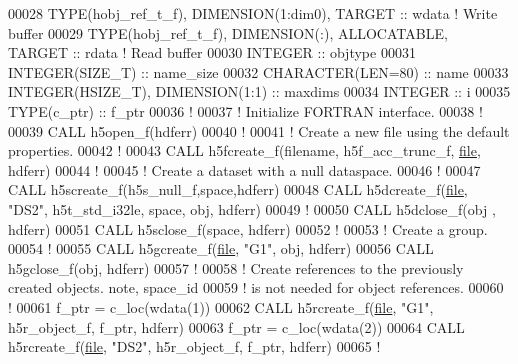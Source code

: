 \begin{DoxyCode}
00028   \textcolor{keywordtype}{TYPE}(hobj\_ref\_t\_f), \textcolor{keywordtype}{DIMENSION(1:dim0)}, \textcolor{keywordtype}{TARGET} :: wdata \textcolor{comment}{! Write buffer}
00029   \textcolor{keywordtype}{TYPE}(hobj\_ref\_t\_f), \textcolor{keywordtype}{DIMENSION(:)}, \textcolor{keywordtype}{ALLOCATABLE}, \textcolor{keywordtype}{TARGET} :: rdata \textcolor{comment}{! Read buffer}
00030   \textcolor{keywordtype}{INTEGER} :: objtype
00031   \textcolor{keywordtype}{INTEGER(SIZE\_T)} :: name\_size
00032   \textcolor{keywordtype}{CHARACTER(LEN=80)} :: name
00033   \textcolor{keywordtype}{INTEGER(HSIZE\_T)}, \textcolor{keywordtype}{DIMENSION(1:1)} :: maxdims
00034   \textcolor{keywordtype}{INTEGER} :: i
00035   \textcolor{keywordtype}{TYPE}(c\_ptr) :: f\_ptr
00036   \textcolor{comment}{!}
00037   \textcolor{comment}{! Initialize FORTRAN interface.}
00038   \textcolor{comment}{!}
00039   \textcolor{keyword}{CALL }h5open\_f(hdferr)
00040   \textcolor{comment}{!}
00041   \textcolor{comment}{! Create a new file using the default properties.}
00042   \textcolor{comment}{!}
00043   \textcolor{keyword}{CALL }h5fcreate\_f(filename, h5f\_acc\_trunc\_f, \hyperlink{structfile}{file}, hdferr)
00044   \textcolor{comment}{!}
00045   \textcolor{comment}{! Create a dataset with a null dataspace.}
00046   \textcolor{comment}{!}
00047   \textcolor{keyword}{CALL }h5screate\_f(h5s\_null\_f,space,hdferr)
00048   \textcolor{keyword}{CALL }h5dcreate\_f(\hyperlink{structfile}{file}, \textcolor{stringliteral}{"DS2"}, h5t\_std\_i32le, space, obj, hdferr)
00049   \textcolor{comment}{!}
00050   \textcolor{keyword}{CALL }h5dclose\_f(obj  , hdferr)
00051   \textcolor{keyword}{CALL }h5sclose\_f(space, hdferr)
00052   \textcolor{comment}{!}
00053   \textcolor{comment}{! Create a group.}
00054   \textcolor{comment}{!}
00055   \textcolor{keyword}{CALL }h5gcreate\_f(\hyperlink{structfile}{file}, \textcolor{stringliteral}{"G1"}, obj, hdferr)
00056   \textcolor{keyword}{CALL }h5gclose\_f(obj, hdferr)
00057   \textcolor{comment}{!}
00058   \textcolor{comment}{! Create references to the previously created objects. note, space\_id}
00059   \textcolor{comment}{! is not needed for object references.}
00060   \textcolor{comment}{!}
00061   f\_ptr = c\_loc(wdata(1))
00062   \textcolor{keyword}{CALL }h5rcreate\_f(\hyperlink{structfile}{file}, \textcolor{stringliteral}{"G1"}, h5r\_object\_f, f\_ptr, hdferr)
00063   f\_ptr = c\_loc(wdata(2))
00064   \textcolor{keyword}{CALL }h5rcreate\_f(\hyperlink{structfile}{file}, \textcolor{stringliteral}{"DS2"}, h5r\_object\_f, f\_ptr, hdferr)
00065   \textcolor{comment}{!}

\end{DoxyCode}
